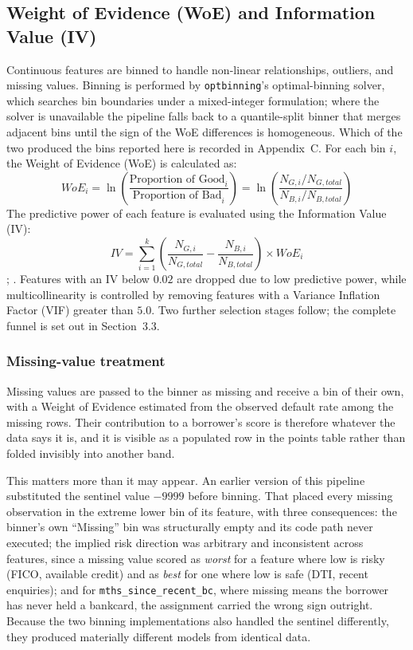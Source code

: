 \documentclass[11pt,a4paper]{article}
\begin{document}
\subsection{Weight of Evidence (WoE) and Information Value (IV)}
Continuous features are binned to handle non-linear relationships, outliers, and missing values. Binning is performed by \texttt{optbinning}'s optimal-binning solver, which searches bin boundaries under a mixed-integer formulation; where the solver is unavailable the pipeline falls back to a quantile-split binner that merges adjacent bins until the sign of the WoE differences is homogeneous. Which of the two produced the bins reported here is recorded in Appendix~C. For each bin $i$, the Weight of Evidence (WoE) is calculated as:
\begin{equation}
WoE_i = \ln\!\left( \frac{\text{Proportion of Good}_i}{\text{Proportion of Bad}_i} \right) = \ln\!\left( \frac{N_{G,i} / N_{G,total}}{N_{B,i} / N_{B,total}} \right)
\end{equation}
The predictive power of each feature is evaluated using the Information Value (IV):
\begin{equation}
IV = \sum_{i=1}^{k} \left( \frac{N_{G,i}}{N_{G,total}} - \frac{N_{B,i}}{N_{B,total}} \right) \times WoE_i
\end{equation}
\parencite[Ch.~4]{siddiqi2017}; \parencite{hand1997}. Features with an IV below $0.02$ are dropped due to low predictive power, while multicollinearity is controlled by removing features with a Variance Inflation Factor (VIF) greater than $5.0$. Two further selection stages follow; the complete funnel is set out in Section~3.3.

\subsubsection*{Missing-value treatment}
Missing values are passed to the binner as missing and receive a bin of their own, with a Weight of Evidence estimated from the observed default rate among the missing rows. Their contribution to a borrower's score is therefore whatever the data says it is, and it is visible as a populated row in the points table rather than folded invisibly into another band.

This matters more than it may appear. An earlier version of this pipeline substituted the sentinel value $-9999$ before binning. That placed every missing observation in the extreme lower bin of its feature, with three consequences: the binner's own ``Missing'' bin was structurally empty and its code path never executed; the implied risk direction was arbitrary and inconsistent across features, since a missing value scored as \emph{worst} for a feature where low is risky (FICO, available credit) and as \emph{best} for one where low is safe (DTI, recent enquiries); and for \texttt{mths\_since\_recent\_bc}, where missing means the borrower has never held a bankcard, the assignment carried the wrong sign outright. Because the two binning implementations also handled the sentinel differently, they produced materially different models from identical data.
\end{document}
